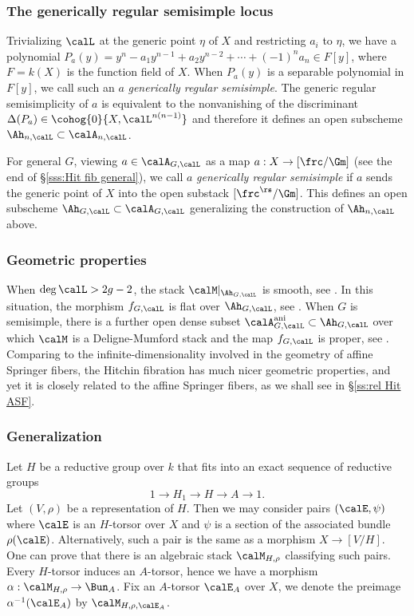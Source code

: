 \subsubsection{The generically regular semisimple locus} Trivializing $\calL$ at the generic point $\eta$ of $X$ and restricting $a_{i}$ to $\eta$, we have a polynomial $P_{a}(y)=y^{n}-a_{1}y^{n-1}+a_{2}y^{n-2}+\cdots +(-1)^{n}a_{n}\in F[y]$, where $F=k(X)$ is the function field of $X$. When $P_{a}(y)$ is a separable polynomial in $F[y]$, we call such an $a$ {\em generically regular semisimple}. The generic regular semisimplicity of $a$ is equivalent to the nonvanishing of the discriminant $\Delta(P_{a})\in\cohog{0}{X,\calL^{n(n-1)}}$ and therefore it defines an open subscheme $\Ah_{n,\calL}\subset \calA_{n,\calL}$. 

For general $G$, viewing $a\in\calA_{G,\calL}$ as a map $a:X\to [\frc/\Gm]$ (see the end of \S\ref{sss:Hit fib general}), we call $a$ {\em generically regular semisimple} if $a$ sends the generic point of $X$ into the open substack $[\frc^{\rs}/\Gm]$. This defines an open subscheme $\Ah_{G,\calL}\subset\calA_{G,\calL}$ generalizing the construction of $\Ah_{n,\calL}$ above.

\subsubsection{Geometric properties}\label{sss:geom Hit} When $\deg \calL>2g-2$, the stack $\calM|_{\Ah_{G,\calL}}$  is smooth, see \cite[Th 4.14.1]{NgoFL}. In this situation, the morphism $f_{G,\calL}$ is flat over $\Ah_{G,\calL}$, see \cite[Cor 4.16.4]{NgoFL}. When $G$ is semisimple, there is a further open dense subset $\calA^{\textup{ani}}_{G,\calL}\subset \Ah_{G,\calL}$ over which $\calM$ is a Deligne-Mumford stack and the map $f_{G,\calL}$ is proper, see \cite[Prop 6.1.3]{NgoFL}. Comparing to the infinite-dimensionality involved in the geometry of affine Springer fibers, the Hitchin fibration has much nicer geometric properties, and yet it is closely related to the affine Springer fibers, as we shall see in \S\ref{ss:rel Hit ASF}. 


\subsubsection{Generalization}\label{sss:general Hitchin} Let $H$ be a reductive group over $k$ that fits into an exact sequence of reductive groups
\begin{equation*}
1\to H_{1}\to H\to A\to 1.
\end{equation*}
Let $(V,\rho)$ be a representation of $H$. Then we may consider pairs $(\calE,\psi)$ where $\calE$ is an $H$-torsor over $X$ and $\psi$ is a section of the associated bundle $\rho(\calE)$. Alternatively, such a pair is the same as a morphism $X\to [V/H]$. One can prove that there is an algebraic stack $\calM_{H, \rho}$ classifying such pairs. Every $H$-torsor induces an $A$-torsor, hence we have a morphism $\alpha: \calM_{H, \rho}\to \Bun_{A}$. Fix an $A$-torsor $\calE_{A}$ over $X$, we denote the preimage $\alpha^{-1}(\calE_{A})$ by $\calM_{H,\rho,\calE_{A}}$.


